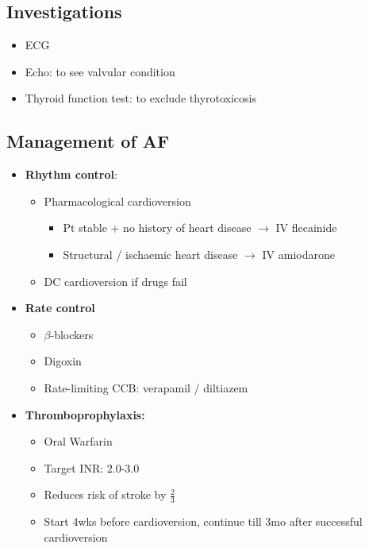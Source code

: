 \documentclass[
  12pt,
]{memoir}
\providecommand{\tightlist}{%
  \setlength{\itemsep}{0pt}\setlength{\parskip}{0pt}}
\begin{document}
\hypertarget{investigations}{%
\subsection{Investigations}\label{investigations}}

\begin{itemize}
\tightlist
\item
  ECG
\item
  Echo: to see valvular condition
\item
  Thyroid function test: to exclude thyrotoxicosis
\end{itemize}

\hypertarget{management-of-af}{%
\subsection{Management of AF}\label{management-of-af}}

\begin{itemize}
\tightlist
\item
  \textbf{Rhythm control}:

  \begin{itemize}
  \tightlist
  \item
    Pharmacological cardioversion

    \begin{itemize}
    \tightlist
    \item
      Pt stable + no history of heart disease \(\rightarrow\) IV
      flecainide
    \item
      Structural / ischaemic heart disease \(\rightarrow\) IV amiodarone
    \end{itemize}
  \item
    DC cardioversion if drugs fail
  \end{itemize}
\item
  \textbf{Rate control}

  \begin{itemize}
  \tightlist
  \item
    \(\beta\)-blockers
  \item
    Digoxin
  \item
    Rate-limiting CCB: verapamil / diltiazem
  \end{itemize}
\item
  \textbf{Thromboprophylaxis:}

  \begin{itemize}
  \tightlist
  \item
    Oral Warfarin
  \item
    Target INR: 2.0-3.0
  \item
    Reduces risk of stroke by \(\frac{2}{3}\)
  \item
    Start 4wks before cardioversion, continue till 3mo after successful
    cardioversion
  \end{itemize}
\end{itemize}
\end{document}
